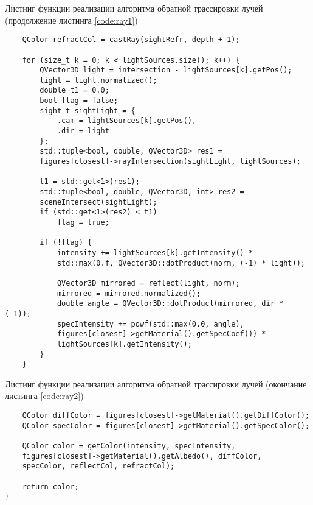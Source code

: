 \begin{code}
\caption{Листинг функции реализации алгоритма обратной трассировки лучей (продолжение листинга \ref{code:ray1})}
\label{code:ray2}
\begin{verbatim}
    QColor refractCol = castRay(sightRefr, depth + 1);
    
    for (size_t k = 0; k < lightSources.size(); k++) {
        QVector3D light = intersection - lightSources[k].getPos();
        light = light.normalized();
        double t1 = 0.0;
        bool flag = false;
        sight_t sightLight = {
            .cam = lightSources[k].getPos(),
            .dir = light
        };
        std::tuple<bool, double, QVector3D> res1 = 
        figures[closest]->rayIntersection(sightLight, lightSources);

        t1 = std::get<1>(res1);
        std::tuple<bool, double, QVector3D, int> res2 = 
        sceneIntersect(sightLight);
        if (std::get<1>(res2) < t1)
            flag = true;

        if (!flag) {
            intensity += lightSources[k].getIntensity() * 
            std::max(0.f, QVector3D::dotProduct(norm, (-1) * light));

            QVector3D mirrored = reflect(light, norm);
            mirrored = mirrored.normalized();
            double angle = QVector3D::dotProduct(mirrored, dir * (-1));
            specIntensity += powf(std::max(0.0, angle), 
            figures[closest]->getMaterial().getSpecCoef()) * 
            lightSources[k].getIntensity();
        }
    }
\end{verbatim}
\end{code}

\begin{code}
\caption{Листинг функции реализации алгоритма обратной трассировки лучей (окончание листинга \ref{code:ray2})}
\label{code:ray3}
\begin{verbatim}
    QColor diffColor = figures[closest]->getMaterial().getDiffColor();
    QColor specColor = figures[closest]->getMaterial().getSpecColor();

    QColor color = getColor(intensity, specIntensity, 
    figures[closest]->getMaterial().getAlbedo(), diffColor, 
    specColor, reflectCol, refractCol);

    return color;
}
\end{verbatim}
\end{code}

